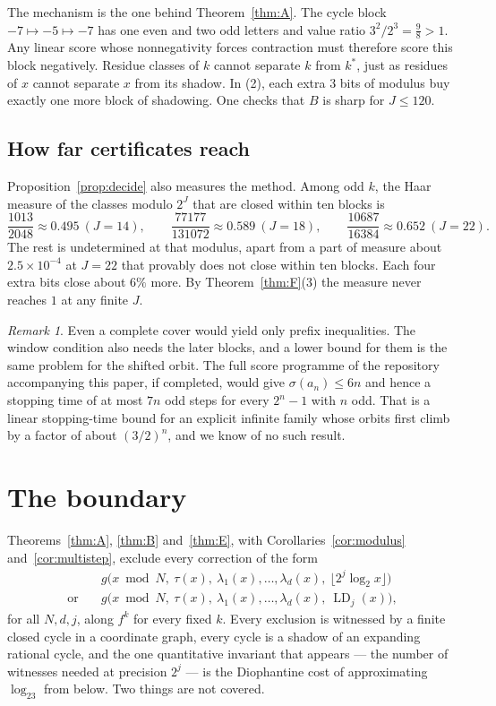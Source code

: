 \documentclass[11pt]{article}
\theoremstyle{definition}
\theoremstyle{remark}
\newtheorem{remark}[theorem]{Remark}
\newcommand{\LD}{\operatorname{LD}}
\begin{document}
The mechanism is the one behind Theorem~\ref{thm:A}. The cycle block
$-7\mapsto-5\mapsto-7$ has one even and two odd letters and value ratio
$3^{2}/2^{3}=\tfrac98>1$. Any linear score whose nonnegativity forces
contraction must therefore score this block negatively. Residue classes
of $k$ cannot separate $k$ from $k^{*}$, just as residues of $x$ cannot
separate $x$ from its shadow. In (2), each extra $3$ bits of modulus
buy exactly one more block of shadowing. One checks that $B$ is sharp
for $J\le120$.

\subsection*{How far certificates reach}

Proposition~\ref{prop:decide} also measures the method. Among odd $k$,
the Haar measure of the classes modulo $2^{J}$ that are closed within
ten blocks is
\[
\frac{1013}{2048}\approx0.495\ (J=14),\qquad
\frac{77177}{131072}\approx0.589\ (J=18),\qquad
\frac{10687}{16384}\approx0.652\ (J=22).
\]
The rest is undetermined at that modulus, apart from a part of measure
about $2.5\times10^{-4}$ at $J=22$ that provably does not close within
ten blocks. Each four extra bits close about $6\%$ more. By
Theorem~\ref{thm:F}(3) the measure never reaches $1$ at any finite $J$.

\begin{remark}\label{rem:spinebarrier}
Even a complete cover would yield only prefix inequalities. The window
condition also needs the later blocks, and a lower bound for them is the
same problem for the shifted orbit. The full score programme of the
repository accompanying this paper, if completed, would give
$\sigma(a_n)\le6n$ and hence a stopping time of at most $7n$ odd steps
for every $2^{n}-1$ with $n$ odd. That is a linear stopping-time bound for an
explicit infinite family whose orbits first climb by a factor of about
$(3/2)^{n}$, and we know of no such result.
\end{remark}

\section{The boundary}\label{sec:boundary}

Theorems~\ref{thm:A}, \ref{thm:B} and~\ref{thm:E}, with
Corollaries~\ref{cor:modulus} and~\ref{cor:multistep}, exclude every
correction of the form
\begin{align*}
&g\bigl(x\bmod N,\ \tau(x),\ \lambda_1(x),\dots,\lambda_d(x),\
\lfloor2^{j}\log_2x\rfloor\bigr)\\
\text{or}\quad
&g\bigl(x\bmod N,\ \tau(x),\ \lambda_1(x),\dots,\lambda_d(x),\
\LD_j(x)\bigr),
\end{align*}
for all $N,d,j$, along $f^{k}$ for every fixed $k$. Every exclusion is
witnessed by a finite closed cycle in a coordinate graph, every cycle is
a shadow of an expanding rational cycle, and the one quantitative
invariant that appears --- the number of witnesses needed at precision
$2^{j}$ --- is the Diophantine cost of approximating $\log_23$ from
below. Two things are not covered.
\end{document}
